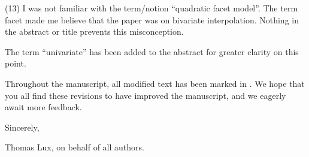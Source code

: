 \goodbreak
{\parindent=20pt \it
  
\item{(13)} I was not familiar with the term/notion ``quadratic facet
  model''. The term facet made me believe that the paper was on
  bivariate interpolation. Nothing in the abstract or title prevents
  this misconception.

}

The term ``univariate'' has been added to the abstract for greater
clarity on this point.

\vfill \eject

Throughout the manuscript, all modified text has been marked in
. We hope that you all find these revisions to have improved
the manuscript, and we eagerly await more feedback.

Sincerely,

Thomas Lux, on behalf of all authors.

\bye


